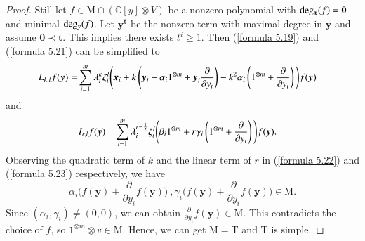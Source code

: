 \documentclass[12pt,reqno]{amsart}
\def\C{\mathbb{C}}
\numberwithin{equation}{section}
\begin{document}
\begin{proof}
Still let $f\in \mathrm{M}\cap (\C[y]\otimes V)$ be a nonzero polynomial with ${\rm deg_{\boldsymbol{x}}}(f)=\boldsymbol{0}$ and minimal ${\rm deg_{\boldsymbol{y}}}(f)$. Let $\boldsymbol{y}^{\boldsymbol{t}}$ be the nonzero term with maximal degree in $\boldsymbol{y}$ and assume $\boldsymbol{0}\prec\boldsymbol{t}$. This implies there exists $t^i\ge 1$. Then (\ref{formula 5.19})  and (\ref{formula 5.21}) can be simplified to
\begin{equation}\label{formula 5.22}
\aligned
L_{k,l}f(\boldsymbol{y})
=&\sum_{i=1}^m\lambda_i^k\zeta_i^l\Bigg(\boldsymbol{x}_i
+k\left(\boldsymbol{y}_i+\alpha_i1^{\otimes m}+\boldsymbol{y}_i\frac{\partial}{\partial{y_i}}  \right)
-k^2\alpha_i\left(1^{\otimes m}+  \frac{\partial}{\partial{y_i}}  \right)
\Bigg)f(\boldsymbol{y})  
\endaligned 
\end{equation}
and
\begin{equation}\label{formula 5.23}
\aligned
I_{r,l}f(\boldsymbol{y})
=&\sum_{i=1}^m\lambda_i^{r-\frac{1}{2}}\zeta_i^l\Bigg{(}\beta_i1^{\otimes m}+r\gamma_i\left(1^{\otimes m}+\frac{\partial}{\partial{y_i}}\right) \Bigg{)} f(\boldsymbol{y}).
\endaligned 
\end{equation}
Observing the quadratic term of $k$ and the linear term of $r$ in (\ref{formula 5.22}) and (\ref{formula 5.23}) respectively, we have 
\[
    \alpha_i\Big(f(\boldsymbol{y})+  \frac{\partial}{\partial{y_i}}f(\boldsymbol{y})  \Big)
 \  ,\gamma_i\Big(f(\boldsymbol{y})+  \frac{\partial}{\partial{y_i}}f(\boldsymbol{y})  \Big) 
\in\mathrm{M}.
\]
Since $(\alpha_i,\gamma_i)\neq (0,0)$, we can obtain $\frac{\partial}{\partial{y_i}}f(\boldsymbol{y})\in\mathrm{M}$. This contradicts the choice of $f$, so $1^{\otimes m}\otimes v\in\mathrm{M}$. 
  Hence,  
  we can get $\mathrm{M}=\mathrm{T}$ and $\mathrm{T}$ is simple.
\end{proof}
\end{document}

